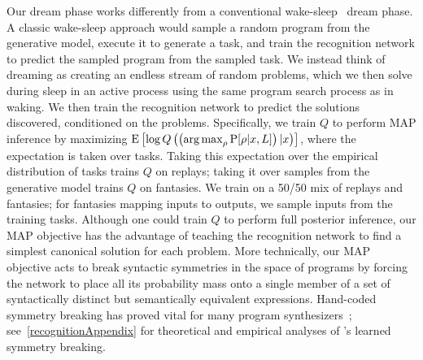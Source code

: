 \documentclass[12pt]{article}
\begin{document}
Our dream phase works differently from a conventional wake-sleep~\cite{hinton1995wake} dream phase. %
%
A classic wake-sleep approach would sample a random program from the generative model,
execute it %
to generate a task, and train the recognition network to predict the sampled program from the sampled task.
We instead think of dreaming as creating an endless stream of random problems,
which we then solve during sleep in an active process using the same program search process as in waking. We then train the recognition network to predict the solutions discovered, conditioned on the problems.
Specifically, we train $Q$ to perform MAP inference
by maximizing $\text{E}\left[\log Q\left(\left(\operatorname*{arg\,max}_{\rho}\text{P}[\rho |x,L] \right)|x \right) \right]$,
where the expectation is taken over tasks. Taking this expectation over the empirical distribution of tasks trains $Q$ on replays; taking it over samples from the generative model trains $Q$ on fantasies. %
We train on a 50/50 mix of replays and fantasies;
for fantasies mapping inputs to outputs, we sample inputs from the training tasks.
Although one could
train $Q$ to perform full posterior inference, %
our MAP objective has the advantage
of teaching the recognition network to find a simplest canonical solution for each problem.
More technically, our MAP objective acts to break syntactic symmetries
in the space of programs by forcing the network to place all its probability mass onto a single member of a set of
syntactically distinct but semantically equivalent expressions.
Hand-coded symmetry breaking has proved vital for many program synthesizers~\cite{solar2008program,feser2015synthesizing};
see~\ref{recognitionAppendix} for theoretical and empirical
analyses of \systemEnding's learned symmetry breaking.



\end{document}
